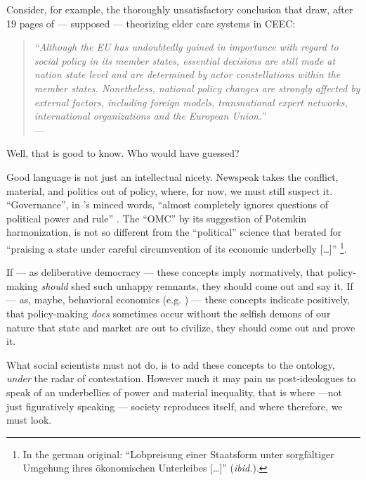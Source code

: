 \documentclass[11pt,a4paper,oneside]{article}
\begin{document}
Consider, for example, the thoroughly unsatisfactory conclusion that \citeauthor{Theobald2009} draw, after 19 pages of --- supposed --- theorizing elder care systems in \gls{CEEC}:
\begin{quote}
	\emph{``Although the EU has undoubtedly gained in importance with regard to social policy in its member states, essential decisions are still made at nation state level and are determined by actor constellations within the member states.
	Nonetheless, national policy changes are strongly affected by external factors, including foreign models, transnational expert networks, international organizations and the European Union.''}\\
	--- \citet[163]{Theobald2009}
\end{quote}
Well, that is good to know.
Who would have guessed?

Good language is not just an intellectual nicety.
Newspeak takes the conflict, material, and politics out of policy, where, for now, we must still suspect it.
``Governance'', in \citeauthor{Jachtenfuchs2001}'s minced words, ``almost completely ignores questions of political power and rule'' \citeyearpar[258]{Jachtenfuchs2001}.
The ``\gls{OMC}'' by its suggestion of Potemkin harmonization, is not so different from the ``political'' science that \cite{Agnoli-1989-aa} berated for ``praising a state under careful circumvention of its economic underbelly [\ldots]'' \citeyearpar[195]{Agnoli-1989-aa}
\footnote{
	In the german original:
	``Lobpreisung einer Staatsform unter sorgf\"{a}ltiger Umgehung ihres \"{o}konomischen Unterleibes [\ldots]'' (\emph{ibid.}).
}.

If --- as deliberative democracy \citep[e.g.][]{Elster-1998-aa} --- these concepts imply normatively, that policy-making \emph{should} shed such unhappy remnants, they should come out and say it.
If --- as, maybe, behavioral economics (e.g. \citealt{Tomasello2009}) --- these concepts indicate positively, that policy-making \emph{does} sometimes occur without the selfish demons of our nature that state and market are out to civilize, they should come out and prove it.

What social scientists must not do, is to add these concepts to the ontology, \emph{under} the radar of contestation.
However much it may pain us post-ideologues to speak of \citeauthor{Agnoli-1989-aa}an underbellies of power and material inequality, that is where ---not just figuratively speaking --- society reproduces itself, and where therefore, we must look.
\end{document}
